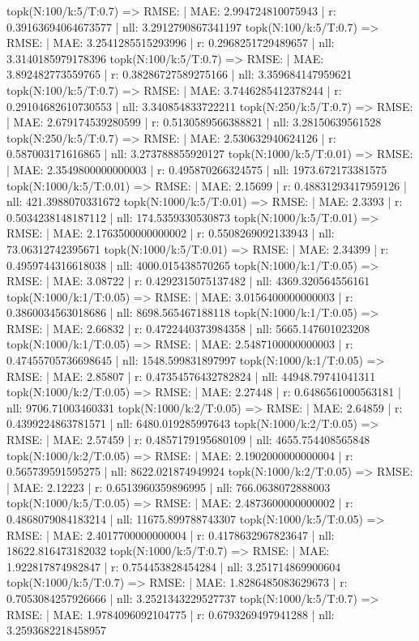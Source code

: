 topk(N:100/k:5/T:0.7) => RMSE: | MAE: 2.994724810075943 | r: 0.39163694064673577 | nll: 3.2912790867341197
topk(N:100/k:5/T:0.7) => RMSE: | MAE: 3.2541285515293996 | r: 0.2968251729489657 | nll: 3.3140185979178396
topk(N:100/k:5/T:0.7) => RMSE: | MAE: 3.892482773559765 | r: 0.38286727589275166 | nll: 3.359684147959621
topk(N:100/k:5/T:0.7) => RMSE: | MAE: 3.7446285412378244 | r: 0.29104682610730553 | nll: 3.340854833722211
topk(N:250/k:5/T:0.7) => RMSE: | MAE: 2.679174539280599 | r: 0.5130589566388821 | nll: 3.28150639561528
topk(N:250/k:5/T:0.7) => RMSE: | MAE: 2.530632940624126 | r: 0.587003171616865 | nll: 3.273788855920127
topk(N:1000/k:5/T:0.01) => RMSE: | MAE: 2.3549800000000003 | r: 0.495870266324575 | nll: 1973.672173381575
topk(N:1000/k:5/T:0.01) => RMSE: | MAE: 2.15699 | r: 0.48831293417959126 | nll: 421.3988070331672
topk(N:1000/k:5/T:0.01) => RMSE: | MAE: 2.3393 | r: 0.5034238148187112 | nll: 174.5359330530873
topk(N:1000/k:5/T:0.01) => RMSE: | MAE: 2.1763500000000002 | r: 0.5508269092133943 | nll: 73.06312742395671
topk(N:1000/k:5/T:0.01) => RMSE: | MAE: 2.34399 | r: 0.4959744316618038 | nll: 4000.015438570265
topk(N:1000/k:1/T:0.05) => RMSE: | MAE: 3.08722 | r: 0.4292315075137482 | nll: 4369.320564556161
topk(N:1000/k:1/T:0.05) => RMSE: | MAE: 3.0156400000000003 | r: 0.3860034563018686 | nll: 8698.565467188118
topk(N:1000/k:1/T:0.05) => RMSE: | MAE: 2.66832 | r: 0.4722440373984358 | nll: 5665.147601023208
topk(N:1000/k:1/T:0.05) => RMSE: | MAE: 2.5487100000000003 | r: 0.47455705736698645 | nll: 1548.599831897997
topk(N:1000/k:1/T:0.05) => RMSE: | MAE: 2.85807 | r: 0.47354576432782824 | nll: 44948.79741041311
topk(N:1000/k:2/T:0.05) => RMSE: | MAE: 2.27448 | r: 0.6486561000563181 | nll: 9706.71003460331
topk(N:1000/k:2/T:0.05) => RMSE: | MAE: 2.64859 | r: 0.4399224863781571 | nll: 6480.019285997643
topk(N:1000/k:2/T:0.05) => RMSE: | MAE: 2.57459 | r: 0.4857179195680109 | nll: 4655.754408565848
topk(N:1000/k:2/T:0.05) => RMSE: | MAE: 2.1902000000000004 | r: 0.565739591595275 | nll: 8622.021874949924
topk(N:1000/k:2/T:0.05) => RMSE: | MAE: 2.12223 | r: 0.6513960359896995 | nll: 766.0638072888003
topk(N:1000/k:5/T:0.05) => RMSE: | MAE: 2.4873600000000002 | r: 0.4868079084183214 | nll: 11675.899788743307
topk(N:1000/k:5/T:0.05) => RMSE: | MAE: 2.4017700000000004 | r: 0.4178632967823647 | nll: 18622.816473182032
topk(N:1000/k:5/T:0.7) => RMSE: | MAE: 1.922817874982847 | r: 0.754453828454284 | nll: 3.251714869900604
topk(N:1000/k:5/T:0.7) => RMSE: | MAE: 1.8286485083629673 | r: 0.7053084257926666 | nll: 3.2521343229527737
topk(N:1000/k:5/T:0.7) => RMSE: | MAE: 1.9784096092104775 | r: 0.6793269497941288 | nll: 3.2593682218458957
